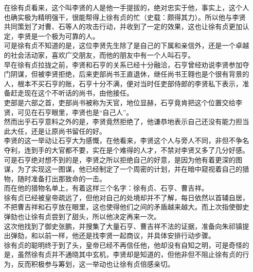 \begin{multicols}{\theparacolNo}
在徐有贞看来，这个叫李贤的人是他一手提拔的，绝对忠实于他，事实上，这个人也确实极为精明强干，很能帮得上徐有贞的忙（史载：颇得其力）。所以他与李贤共同策划了对曹、石等人的攻击行动，并收到了一定的效果，这也让徐有贞更加认定，李贤是一个极为可靠的人。\\

可是徐有贞不知道的是，这位李贤先生除了是自己的下属和亲信外，还是一个卓越的社会活动家，喜欢广交朋友，而他的朋友中有一个人叫石亨。\\

早在徐有贞拉拢之前，李贤和石亨的关系已经十分融洽，石亨曾经劝说李贤参加夺门阴谋，但被李贤拒绝，后来吏部尚书王直退休，继任尚书王翱也是个很有背景的人，根本不买石亨的账，石亨十分不满，便对当时任吏部侍郎的李贤私下表示，准备赶走现在这个不听话的尚书，由他接任。\\

吏部是六部之首，吏部尚书被称为天官，地位显赫，石亨竟肯把这个位置交给李贤，可见在石亨眼里，李贤也是“自己人”。\\

然而出乎石亨意料之外的是，李贤竟然拒绝了，他谦恭地表示自己还没有能力担当此大任，还是让原尚书留任的好。\\

李贤的这一举动让石亨大为感慨，在他看来，李贤这个人与旁人不同，非但不争名夺利，连到手的大官都不要，实在是个难得的人才，不禁对李贤又多了几分好感。\\

可是石亨绝对想不到的是，李贤之所以拒绝自己的好意，是因为他有着更深的图谋，为了实现这一图谋，他已经制定了一个周密的计划，并在暗中窥视着自己的猎物，随时准备打出那致命的一击。\\

而在他的猎物名单上，有着这样三个名字：徐有贞、石亨、曹吉祥。\\

徐有贞已经被皇帝疏远了，但他对自己的处境却并不了解，每日依然以首辅自居，不把曹吉祥和石亨放在眼里，这也使得他们之间的矛盾越来越大。而上次指使御史弹劾也让徐有贞尝到了甜头，所以他决定再来一次。\\

这次他找到了御史张鹏，并搜集了大量石亨、曹吉祥不法的证据，准备向朱祁镇提出弹劾，和以前一样，他还是找李贤一起商议，并具体安排行动步骤。\\

徐有贞的聪明终于到了头，皇帝已经不再信任他，他却没有自知之明，可是奇怪的是，虽然徐有贞并不通晓其中玄机，李贤却是知道的，但他非但不阻止徐有贞的行为，反而积极参与筹划，这一举动也让徐有贞倍感亲切。\\


\end{multicols}

